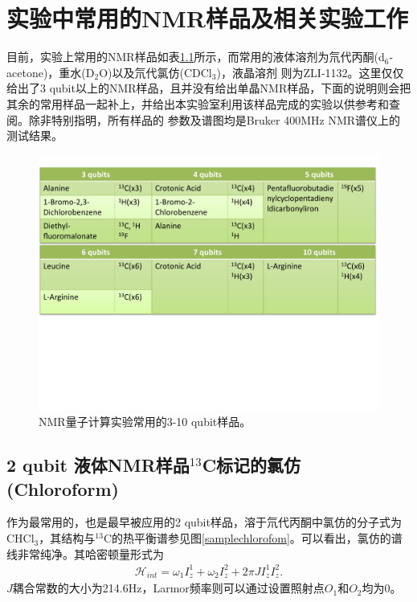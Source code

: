 ﻿
\chapter{实验中常用的NMR样品及相关实验工作}

目前，实验上常用的NMR样品如表\ref{allsample}所示，而常用的液体溶剂为氘代丙酮(d$_6$-acetone)，重水(D$_2$O)以及氘代氯仿(CDCl$_3$)，液晶溶剂
则为ZLI-1132。这里仅仅给出了3 qubit以上的NMR样品，且并没有给出单晶NMR样品，下面的说明则会把其余的常用样品一起补上，并给出本实验室利用该样品完成的实验以供参考和查阅。除非特别指明，所有样品的
参数及谱图均是Bruker 400MHz NMR谱仪上的测试结果。

\begin{figure}[htbp]
            \begin{center}
              \includegraphics[width= 0.8\columnwidth]{figures/allsample.pdf}
              \caption{NMR量子计算实验常用的3-10 qubit样品。}
              \label{allsample}
            \end{center}
\end{figure}

\section{2 qubit 液体NMR样品$^{13}$C标记的氯仿(Chloroform)}

作为最常用的，也是最早被应用的2 qubit样品，溶于氘代丙酮中氯仿的分子式为CHCl$_3$，其结构与$^{13}$C的热平衡谱参见图\ref{samplechlorofom}。可以看出，氯仿的谱线非常纯净。其哈密顿量形式为
\begin{eqnarray}
\mathcal{H}_{int}=\omega_1I_z^1+\omega_2I_z^2+2\pi J I_z^1I_z^2.
\end{eqnarray}
$J$耦合常数的大小为214.6Hz，Larmor频率则可以通过设置照射点$O_1$和$O_2$均为0。

